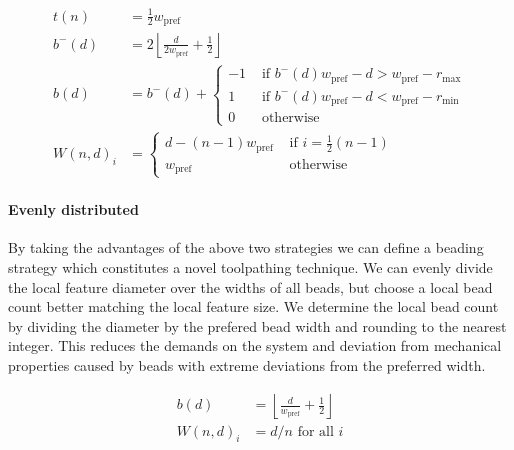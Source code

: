 \begin{align*}
t(n) &= \frac12 w_\text{pref} \\
b^-(d) &= 2 \left\lfloor \frac{d}{ 2w_\text{pref}} + \frac12 \right\rfloor \\
b(d) &= b^-(d) +
\begin{cases}
-1 & \text{ if } b^-(d) w_\text{pref} - d > w_\text{pref} - r_\text{max} \\
1  & \text{ if }  b^-(d) w_\text{pref} - d < w_\text{pref} - r_\text{min} \\
0 & \text{ otherwise}
\end{cases}
\\
W(n,d)_i &= 
\begin{cases}
d - (n-1) w_\text{pref} &\text{ if } i = \frac12 (n-1) \\
w_\text{pref} &\text{ otherwise }
\end{cases}
\end{align*}





\paragraph{Evenly distributed}
By taking the advantages of the above two strategies we can define a beading strategy which constitutes a novel toolpathing technique.
We can evenly divide the local feature diameter over the widths of all beads, but choose a local bead count better matching the local feature size.
We determine the local bead count by dividing the diameter by the prefered bead width and rounding to the nearest integer.
This reduces the demands on the system and deviation from mechanical properties caused by beads with extreme deviations from the preferred width.



\begin{align*}
b(d) &= \left\lfloor \frac{d}{ w_\text{pref}} + \frac12 \right\rfloor \\
W(n,d)_i &= d / n \text{ for all } i 
\end{align*}




